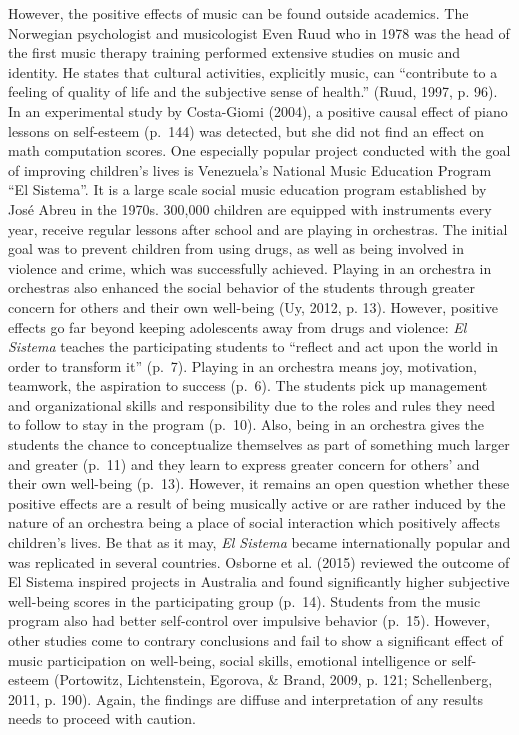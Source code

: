 \documentclass[a4, 12pt]{article}
\begin{document}
However, the positive effects of music can be found outside academics. The Norwegian psychologist and musicologist Even Ruud who in 1978 was the head of the first music therapy training performed extensive studies on music and identity. He states that cultural activities, explicitly music, can ``contribute to a feeling of quality of life and the subjective sense of health.'' (Ruud, 1997, p. 96). In an experimental study by Costa-Giomi (2004), a positive causal effect of piano lessons on self-esteem (p.~144) was detected, but she did not find an effect on math computation scores. One especially popular project conducted with the goal of improving children's lives is Venezuela's National Music Education Program ``El Sistema''. It is a large scale social music education program established by José Abreu in the 1970s. 300,000 children are equipped with instruments every year, receive regular lessons after school and are playing in orchestras. The initial goal was to prevent children from using drugs, as well as being involved in violence and crime, which was successfully achieved. Playing in an orchestra in orchestras also enhanced the social behavior of the students through greater concern for others and their own well-being (Uy, 2012, p. 13). However, positive effects go far beyond keeping adolescents away from drugs and violence: \emph{El Sistema} teaches the participating students to ``reflect and act upon the world in order to transform it'' (p.~7). Playing in an orchestra means joy, motivation, teamwork, the aspiration to success (p.~6). The students pick up management and organizational skills and responsibility due to the roles and rules they need to follow to stay in the program (p.~10). Also, being in an orchestra gives the students the chance to conceptualize themselves as part of something much larger and greater (p.~11) and they learn to express greater concern for others' and their own well-being (p.~13). However, it remains an open question whether these positive effects are a result of being musically active or are rather induced by the nature of an orchestra being a place of social interaction which positively affects children's lives. Be that as it may, \emph{El Sistema} became internationally popular and was replicated in several countries. Osborne et al. (2015) reviewed the outcome of El Sistema inspired projects in Australia and found significantly higher subjective well-being scores in the participating group (p.~14). Students from the music program also had better self-control over impulsive behavior (p.~15). However, other studies come to contrary conclusions and fail to show a significant effect of music participation on well-being, social skills, emotional intelligence or self-esteem (Portowitz, Lichtenstein, Egorova, \& Brand, 2009, p. 121; Schellenberg, 2011, p. 190). Again, the findings are diffuse and interpretation of any results needs to proceed with caution.
\end{document}
